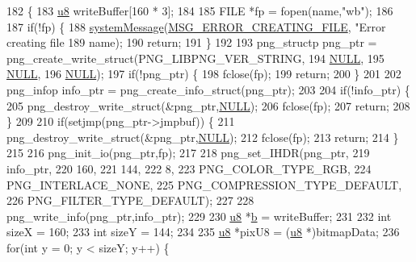 \begin{DoxyCode}
182 \{
183   \mbox{\hyperlink{_system_8h_aed742c436da53c1080638ce6ef7d13de}{u8}} writeBuffer[160 * 3];
184   
185   FILE *fp = fopen(name,\textcolor{stringliteral}{"wb"});
186 
187   \textcolor{keywordflow}{if}(!fp) \{
188     \mbox{\hyperlink{system_8cpp_a747a9cb8e015a3d45cca636b5bd0fc69}{systemMessage}}(\mbox{\hyperlink{_n_l_s_8h_a165f1f2539e202f0a24e6e9583c63475}{MSG\_ERROR\_CREATING\_FILE}}, \textcolor{stringliteral}{"Error creating file %
189                   name);
190     \textcolor{keywordflow}{return};
191   \}
192   
193   png\_structp png\_ptr = png\_create\_write\_struct(PNG\_LIBPNG\_VER\_STRING,
194                                                 \mbox{\hyperlink{getopt1_8c_a070d2ce7b6bb7e5c05602aa8c308d0c4}{NULL}},
195                                                 \mbox{\hyperlink{getopt1_8c_a070d2ce7b6bb7e5c05602aa8c308d0c4}{NULL}},
196                                                 \mbox{\hyperlink{getopt1_8c_a070d2ce7b6bb7e5c05602aa8c308d0c4}{NULL}});
197   \textcolor{keywordflow}{if}(!png\_ptr) \{
198     fclose(fp);
199     \textcolor{keywordflow}{return};
200   \}
201 
202   png\_infop info\_ptr = png\_create\_info\_struct(png\_ptr);
203   
204   \textcolor{keywordflow}{if}(!info\_ptr) \{
205     png\_destroy\_write\_struct(&png\_ptr,\mbox{\hyperlink{getopt1_8c_a070d2ce7b6bb7e5c05602aa8c308d0c4}{NULL}});
206     fclose(fp);
207     \textcolor{keywordflow}{return};
208   \}
209   
210   \textcolor{keywordflow}{if}(setjmp(png\_ptr->jmpbuf)) \{
211     png\_destroy\_write\_struct(&png\_ptr,\mbox{\hyperlink{getopt1_8c_a070d2ce7b6bb7e5c05602aa8c308d0c4}{NULL}});
212     fclose(fp);
213     \textcolor{keywordflow}{return};
214   \}
215 
216   png\_init\_io(png\_ptr,fp);
217 
218   png\_set\_IHDR(png\_ptr,
219                info\_ptr,
220                160,
221                144,
222                8,
223                PNG\_COLOR\_TYPE\_RGB,
224                PNG\_INTERLACE\_NONE,
225                PNG\_COMPRESSION\_TYPE\_DEFAULT,
226                PNG\_FILTER\_TYPE\_DEFAULT);
227 
228   png\_write\_info(png\_ptr,info\_ptr);
229 
230   \mbox{\hyperlink{_system_8h_aed742c436da53c1080638ce6ef7d13de}{u8}} *\mbox{\hyperlink{expr-lex_8cpp_a91b64995742fd30063314f12340b4b5a}{b}} = writeBuffer;
231 
232   \textcolor{keywordtype}{int} sizeX = 160;
233   \textcolor{keywordtype}{int} sizeY = 144;
234 
235   \mbox{\hyperlink{_system_8h_aed742c436da53c1080638ce6ef7d13de}{u8}} *pixU8 = (\mbox{\hyperlink{_system_8h_aed742c436da53c1080638ce6ef7d13de}{u8}} *)bitmapData;
236   \textcolor{keywordflow}{for}(\textcolor{keywordtype}{int} y = 0; y < sizeY; y++) \{
}
\end{DoxyCode}
